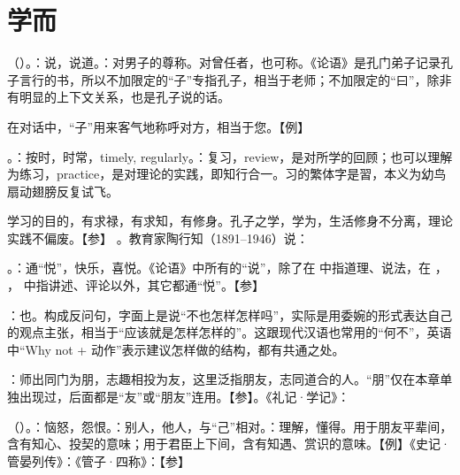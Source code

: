 \chapter{学而}

{
\item {}（）。：说，说道。：对男子的尊称。对曾任者，也可称。《论语》是孔门弟子记录孔子言行的书，所以不加限定的“子”专指孔子，相当于老师；不加限定的“曰”，除非有明显的上下文关系，也是孔子说的话。

在对话中，“子”用来客气地称呼对方，相当于您。【例】 
\item {}。：按时，时常，timely, regularly。：复习，review，是对所学的回顾；也可以理解为练习，practice，是对理论的实践，即知行合一。习的繁体字是習，本义为幼鸟扇动翅膀反复试飞。 %

学习的目的，有求禄，有求知，有修身。孔子之学，学为，生活修身不分离，理论实践不偏废。【参】    。教育家陶行知（1891--1946）说：

\item {}。：通“悦”，快乐，喜悦。《论语》中所有的“说”，除了在  中指道理、说法，在  ， ， 中指讲述、评论以外，其它都通“悦”。【参】

：也。构成反问句，字面上是说“不也怎样怎样吗”，实际是用委婉的形式表达自己的观点主张，相当于“应该就是怎样怎样的”。这跟现代汉语也常用的“何不”，英语中“Why not + 动作”表示建议怎样做的结构，都有共通之处。
\item {}：师出同门为朋，志趣相投为友，这里泛指朋友，志同道合的人。“朋”仅在本章单独出现过，后面都是“友”或“朋友”连用。【参】。《礼记·学记》：

\item {}（）。：恼怒，怨恨。：别人，他人，与“己”相对。：理解，懂得。用于朋友平辈间，含有知心、投契的意味；用于君臣上下间，含有知遇、赏识的意味。【例】《史记·管晏列传》：《管子·四称》：【参】

}
